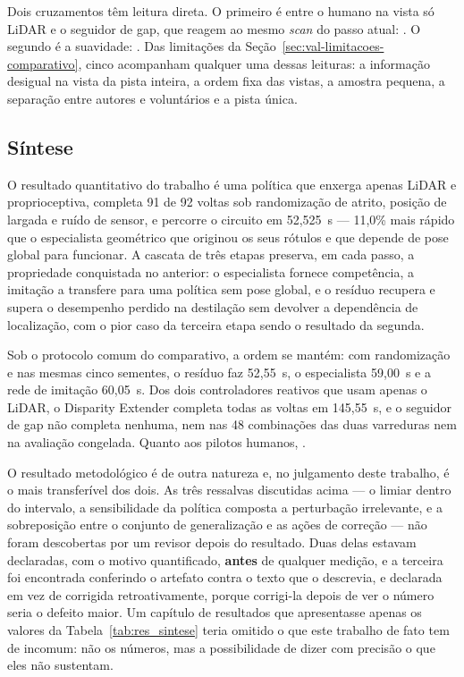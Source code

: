 Dois cruzamentos têm leitura direta. O primeiro é entre o humano na vista só
LiDAR e o seguidor de gap, que reagem ao mesmo \textit{scan} do passo atual:
. O segundo é a suavidade:
. Das limitações da Seção~\ref{sec:val-limitacoes-comparativo},
cinco acompanham qualquer uma dessas leituras: a informação desigual na vista da
pista inteira, a ordem fixa das vistas, a amostra pequena, a separação entre
autores e voluntários e a pista única.


\subsection{Síntese}

O resultado quantitativo do trabalho é uma política que enxerga apenas LiDAR e
proprioceptiva, completa 91 de 92 voltas sob randomização de atrito, posição de
largada e ruído de sensor, e percorre o circuito em 52,525~s --- 11,0\% mais
rápido que o especialista geométrico que originou os seus rótulos e que depende
de pose global para funcionar. A cascata de três etapas preserva, em cada passo,
a propriedade conquistada no anterior: o especialista fornece competência, a
imitação a transfere para uma política sem pose global, e o resíduo recupera e supera
o desempenho perdido na destilação sem devolver a dependência de localização, com
o pior caso da terceira etapa sendo o resultado da segunda.

Sob o protocolo comum do comparativo, a ordem se mantém: com randomização e nas
mesmas cinco sementes, o resíduo faz 52,55~s, o especialista 59,00~s e a rede de
imitação 60,05~s. Dos dois controladores reativos que usam apenas o LiDAR, o
Disparity Extender completa todas as voltas em 145,55~s, e o seguidor de gap não
completa nenhuma, nem nas 48 combinações das duas varreduras nem na avaliação
congelada. Quanto aos pilotos humanos, .

O resultado metodológico é de outra natureza e, no julgamento deste trabalho, é o
mais transferível dos dois. As três ressalvas discutidas acima --- o limiar dentro
do intervalo, a sensibilidade da política composta a perturbação irrelevante, e a
sobreposição entre o conjunto de generalização e as ações de correção --- não
foram descobertas por um revisor depois do resultado. Duas delas estavam
declaradas, com o motivo quantificado, \textbf{antes} de qualquer medição, e a
terceira foi encontrada conferindo o artefato contra o texto que o descrevia, e
declarada em vez de corrigida retroativamente, porque corrigi-la depois de ver o
número seria o defeito maior. Um capítulo de resultados que apresentasse apenas os
valores da Tabela~\ref{tab:res_sintese} teria omitido o que este trabalho de fato
tem de incomum: não os números, mas a possibilidade de dizer com precisão o que
eles não sustentam.
